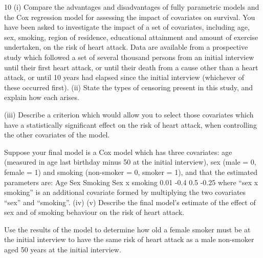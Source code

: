 \documentclass[a4paper,12pt]{article}
\begin{document}
\begin{enumerate}
10
(i)
Compare the advantages and disadvantages of fully parametric models and the
Cox regression model for assessing the impact of covariates on survival. 
You have been asked to investigate the impact of a set of covariates, including age,
sex, smoking, region of residence, educational attainment and amount of exercise
undertaken, on the risk of heart attack. Data are available from a prospective study
which followed a set of several thousand persons from an initial interview until their
first heart attack, or until their death from a cause other than a heart attack, or until 10
years had elapsed since the initial interview (whichever of these occurred first).
(ii) State the types of censoring present in this study, and explain how each arises.

(iii) Describe a criterion which would allow you to select those covariates which
have a statistically significant effect on the risk of heart attack, when
controlling the other covariates of the model.

Suppose your final model is a Cox model which has three covariates: age (measured
in age last birthday minus 50 at the initial interview), sex (male = 0, female = 1) and
smoking (non-smoker = 0, smoker = 1), and that the estimated parameters are:
Age
Sex
Smoking
Sex x smoking
0.01
-0.4
0.5
-0.25
where “sex x smoking” is an additional covariate formed by multiplying the two
covariates “sex” and “smoking”.
(iv)
(v)
Describe the final model’s estimate of the effect of sex and of smoking
behaviour on the risk of heart attack.

Use the results of the model to determine how old a female smoker must be at
the initial interview to have the same risk of heart attack as a male non-smoker
aged 50 years at the initial interview.


\end{enumerate}
\end{document}
